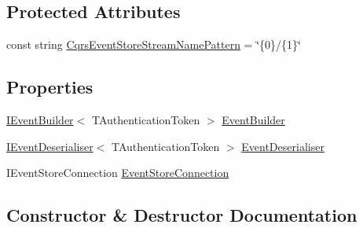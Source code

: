 \subsection*{Protected Attributes}
\begin{DoxyCompactItemize}
\item 
const string \hyperlink{classCqrs_1_1EventStore_1_1EventStore_ae9733f8511daf86ae3dac78bcbc5b2f0}{Cqrs\+Event\+Store\+Stream\+Name\+Pattern} = \char`\"{}\{0\}/\{1\}\char`\"{}
\end{DoxyCompactItemize}
\subsection*{Properties}
\begin{DoxyCompactItemize}
\item 
\hyperlink{interfaceCqrs_1_1EventStore_1_1IEventBuilder}{I\+Event\+Builder}$<$ T\+Authentication\+Token $>$ \hyperlink{classCqrs_1_1EventStore_1_1EventStore_ae1bc9d364582e951ccdc0f91908b94a2}{Event\+Builder}
\item 
\hyperlink{interfaceCqrs_1_1EventStore_1_1IEventDeserialiser}{I\+Event\+Deserialiser}$<$ T\+Authentication\+Token $>$ \hyperlink{classCqrs_1_1EventStore_1_1EventStore_a2b9140681d6bd25afb3a842e4cbf37cf}{Event\+Deserialiser}
\item 
I\+Event\+Store\+Connection \hyperlink{classCqrs_1_1EventStore_1_1EventStore_ab1184aea49c7b0009a8f27d38f585952}{Event\+Store\+Connection}
\end{DoxyCompactItemize}


\subsection{Constructor \& Destructor Documentation}
\mbox{\label{classCqrs_1_1EventStore_1_1EventStore_ab48ad2c9d72780ae3a662e213498f194}} 
